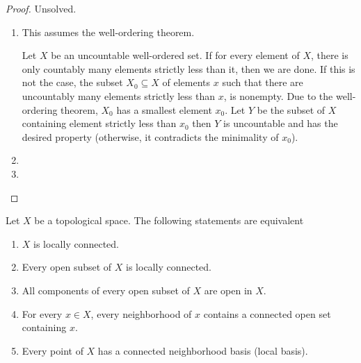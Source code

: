 \begin{proof}
	Unsolved.
	\begin{enumerate}[label={(\alph*)}]
		\item This assumes the well-ordering theorem.

		      Let $X$ be an uncountable well-ordered set. If for every element of $X$, there is only countably many elements strictly less than it, then we are done. If this is not the case, the subset $X_{0}\subseteq X$ of elements $x$ such that there are uncountably many elements strictly less than $x$, is nonempty. Due to the well-ordering theorem, $X_{0}$ has a smallest element $x_{0}$. Let $Y$ be the subset of $X$ containing element strictly less than $x_{0}$ then $Y$ is uncountable and has the desired property (otherwise, it contradicts the minimality of $x_{0}$).
		\item
		\item
	\end{enumerate}
\end{proof}

\begin{note}\label{note:characterizations-of-local-connectedness}
	Let $X$ be a topological space. The following statements are equivalent
	\begin{enumerate}[label={(\alph*)}]
		\item $X$ is locally connected.
		\item Every open subset of $X$ is locally connected.
		\item All components of every open subset of $X$ are open in $X$.
		\item For every $x\in X$, every neighborhood of $x$ contains a connected open set containing $x$.
		\item Every point of $X$ has a connected neighborhood basis (local basis).
	\end{enumerate}
\end{note}

